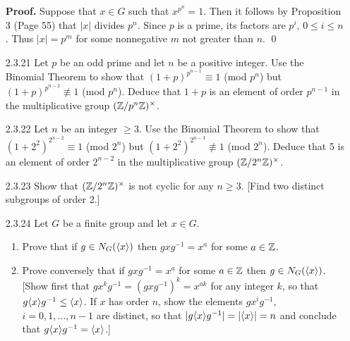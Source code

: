 \begin{enumerate}
      \textbf{Proof.} Suppose that $x \in G$ such that $x^{p^n} = 1$. Then it
      follows by Proposition 3 (Page 55) that $|x|$ divides $p^n$. Since $p$ is
      a prime, its factors are $p^i$, $0 \le i \le n$. Thus $|x| = p^m$ for
      some nonnegative $m$ not greater than $n$. \qed
   \item[2.3.21]  Let $p$ be an odd prime and let $n$ be a positive integer. Use
                  the Binomial Theorem to show that
                  $(1+p)^{p^{n-1}} \equiv 1$ (mod $p^n$) but
                  $(1+p)^{p^{n-2}} \not\equiv 1$ (mod $p^n$). Deduce that $1+p$
                  is an element of order $p^{n-1}$ in the multiplicative group
                  $(\mathbb{Z}/p^n\mathbb{Z})^\times$.
   \item[2.3.22]  Let $n$ be an integer $\ge 3$. Use the Binomial Theorem to
                  show that $(1+2^2)^{2^{n-2}} \equiv 1$ (mod $2^n$) but
                  $(1+2^2)^{2^{n-3}} \not\equiv 1$ (mod $2^n$). Deduce that 5 is
                  an element of order $2^{n-2}$ in the multiplicative group
                  $(\mathbb{Z}/2^n\mathbb{Z})^\times$.
   \item[2.3.23]  Show that $(\mathbb{Z}/2^n\mathbb{Z})^\times$ is not cyclic for any $n \ge 3$.
                  [Find two distinct subgroups of order 2.]
   \item[2.3.24]  Let $G$ be a finite group and let $x \in G$.
                  \begin{enumerate}
                     \item Prove that if $g \in N_G(\langle x \rangle)$ then
                           $gxg^{-1} = x^a$ for some $a \in \mathbb{Z}$. 
                     \item Prove conversely that if $gxg^{-1} = x^a$ for some
                           $a \in \mathbb{Z}$ then $g \in N_G(\langle x \rangle)$. [Show first
                           that $gx^kg^{-1} = (gxg^{-1})^k = x^{ak}$ for any
                           integer $k$, so that $g\langle x \rangle g^{-1} \le \langle x \rangle$.
                           If $x$ has order $n$, show the elements $gx^ig^{-1}$,
                           $i = 0, 1, \ldots, n-1$ are distinct, so that
                           $|g\langle x \rangle g^{-1}| = |\langle x \rangle| = n$ and conclude that
                           $g\langle x \rangle g^{-1} = \langle x \rangle$.]

\end{enumerate}
\end{enumerate}
